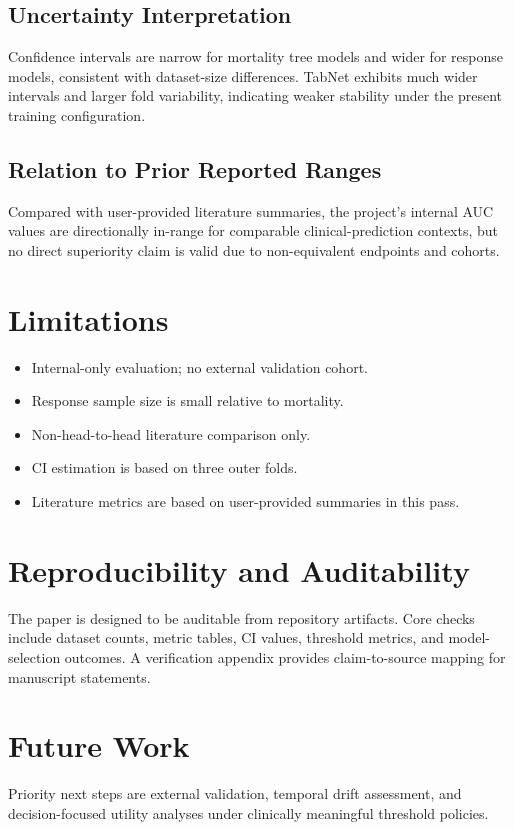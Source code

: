 \documentclass[conference]{IEEEtran}
\begin{document}
\subsection{Uncertainty Interpretation}
Confidence intervals are narrow for mortality tree models and wider for response models, consistent with dataset-size differences. TabNet exhibits much wider intervals and larger fold variability, indicating weaker stability under the present training configuration.

\subsection{Relation to Prior Reported Ranges}
Compared with user-provided literature summaries, the project's internal AUC values are directionally in-range for comparable clinical-prediction contexts, but no direct superiority claim is valid due to non-equivalent endpoints and cohorts.

\section{Limitations}
\begin{itemize}
    \item Internal-only evaluation; no external validation cohort.
    \item Response sample size is small relative to mortality.
    \item Non-head-to-head literature comparison only.
    \item CI estimation is based on three outer folds.
    \item Literature metrics are based on user-provided summaries in this pass.
\end{itemize}

\section{Reproducibility and Auditability}
The paper is designed to be auditable from repository artifacts. Core checks include dataset counts, metric tables, CI values, threshold metrics, and model-selection outcomes. A verification appendix provides claim-to-source mapping for manuscript statements.

\section{Future Work}
Priority next steps are external validation, temporal drift assessment, and decision-focused utility analyses under clinically meaningful threshold policies.
\end{document}
